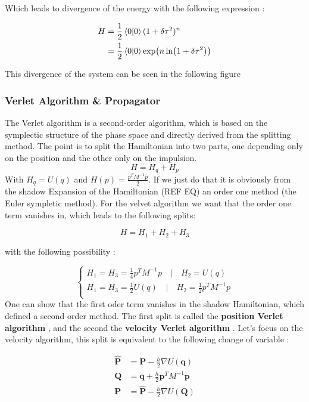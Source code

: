 \documentclass[ansiapaper]{report}
\begin{document}
\begin{multicols}{3}
	Which leads to divergence of the energy with the following expression :

	\begin{align*}
		H & = \frac{1}{2}\braket{0}{0}(1 + \delta \tau^2)^n          \\
		  & = \frac{1}{2}\braket{0}{0}\exp(n \ln(1 + \delta \tau^2))
		\\
	\end{align*}

	This divergence of the system can be seen in the following figure 

	\subsubsection{Verlet Algorithm \& Propagator}

	The Verlet algorithm is a second-order algorithm, which is based on the symplectic structure of the phase space and directly derived from the splitting method. The point is to split the Hamiltonian into two parts, one depending only on the position and the other only on the impulsion. $$H = H_q + H_p$$ With $H_q = U(q)$ and $H(p) = \frac{p^TM^{-1}p}{2}$. If we just do that it is obviously from the shadow Expansion of the Hamiltonian (REF EQ) an order one method (the Euler sympletic method). For the velvet algorithm we want that the order one term vanishes in, which leads to the following splits:

	$$H = H_1 + H_2 + H_3$$

	with the following possibility :

	$$\begin{cases*}
			H_1 = H_3 = \frac{1}{4}p^TM^{-1}p \quad|\quad H_2 = U(q)             \\
			H_1 = H_3 = \frac{1}{2}U(q) \quad|\quad  H_2 = \frac{1}{2}p^TM^{-1}p \\
		\end{cases*}
	$$
	One can show that the first oder term vanishes in the shadow Hamiltonian, which defined a second order method. The first split is called the \textbf{position Verlet algorithm} , and the second the \textbf{velocity Verlet algorithm} . Let's focus on the velocity algorithm, this split is equivalent to the following change of variable :

	\begin{align}
		\hat{\textbf{P} } & = \textbf{P}  - \frac{h}{2} \nabla U(\textbf{q} )         \\
		\textbf{Q}        & = \textbf{q}  +  \frac{h}{2}\textbf{p} ^TM^{-1}\textbf{p} \\
		\textbf{P}        & = \hat{\textbf{P} } - \frac{h}{2} \nabla U(\textbf{Q} )
	\end{align}


\end{multicols}
\end{document}
